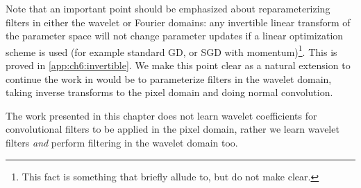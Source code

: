 Note that an important point should be emphasized about reparameterizing filters
in either the wavelet or Fourier domains: any invertible linear
transform of the parameter space will not change parameter updates if a linear
optimization scheme is used (for example standard GD, or SGD with momentum)\footnote{This fact 
is something that \citeauthor{rippel_spectral_2015} briefly allude to, but do not make clear.}.
This is proved in \autoref{app:ch6:invertible}.  
We make this point clear as a natural extension to continue the work
in \cite{rippel_spectral_2015} would be to parameterize filters in the wavelet domain,
taking inverse transforms to the pixel domain and doing normal convolution. 

The work presented in this chapter does not learn wavelet coefficients 
for convolutional filters to be applied in the pixel domain, rather we learn wavelet filters 
\emph{and} perform filtering in the wavelet domain too.

